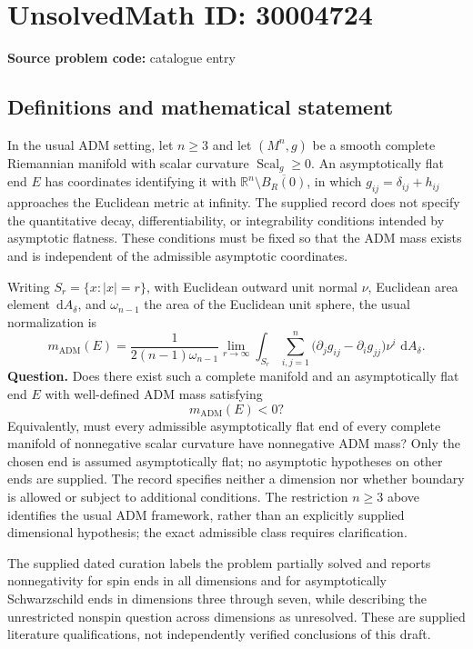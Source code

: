 \documentclass[11pt]{article}
\newcommand{\R}{\mathbb{R}}
\newcommand{\dd}{\,\mathrm{d}}
\begin{document}
\section*{UnsolvedMath ID: 30004724}
\textbf{Source problem code:} catalogue entry
\subsection{Definitions and mathematical statement}
In the usual ADM setting, let \(n\geq 3\) and let \((M^n,g)\) be a smooth complete Riemannian manifold with scalar curvature \(\operatorname{Scal}_g\geq 0\). An asymptotically flat end \(E\) has coordinates identifying it with \(\R^n\setminus\overline{B_R(0)}\), in which \(g_{ij}=\delta_{ij}+h_{ij}\) approaches the Euclidean metric at infinity. The supplied record does not specify the quantitative decay, differentiability, or integrability conditions intended by asymptotic flatness. These conditions must be fixed so that the ADM mass exists and is independent of the admissible asymptotic coordinates.

Writing \(S_r=\{x:|x|=r\}\), with Euclidean outward unit normal \(\nu\), Euclidean area element \(\dd A_\delta\), and \(\omega_{n-1}\) the area of the Euclidean unit sphere, the usual normalization is
\[
 m_{\mathrm{ADM}}(E)=\frac{1}{2(n-1)\omega_{n-1}}\lim_{r\to\infty}\int_{S_r}\sum_{i,j=1}^{n}\bigl(\partial_jg_{ij}-\partial_i g_{jj}\bigr)\nu^i\,\dd A_\delta.
\]
\textbf{Question.} Does there exist such a complete manifold and an asymptotically flat end \(E\) with well-defined ADM mass satisfying
\[
 m_{\mathrm{ADM}}(E)<0?
\]
Equivalently, must every admissible asymptotically flat end of every complete manifold of nonnegative scalar curvature have nonnegative ADM mass? Only the chosen end is assumed asymptotically flat; no asymptotic hypotheses on other ends are supplied. The record specifies neither a dimension nor whether boundary is allowed or subject to additional conditions. The restriction \(n\geq3\) above identifies the usual ADM framework, rather than an explicitly supplied dimensional hypothesis; the exact admissible class requires clarification.

The supplied dated curation labels the problem partially solved and reports nonnegativity for spin ends in all dimensions and for asymptotically Schwarzschild ends in dimensions three through seven, while describing the unrestricted nonspin question across dimensions as unresolved. These are supplied literature qualifications, not independently verified conclusions of this draft.
\end{document}
